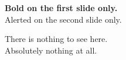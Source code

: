 \documentclass{beamer}
\begin{document}
\begin{frame}

\textbf<1>{Bold on the first slide only.}\\
\alert<2>{Alerted on the second slide only.}

\end{frame}


\begin{frame}

There is nothing to see here.\\
Absolutely nothing at all.

\end{frame}
\end{document}
